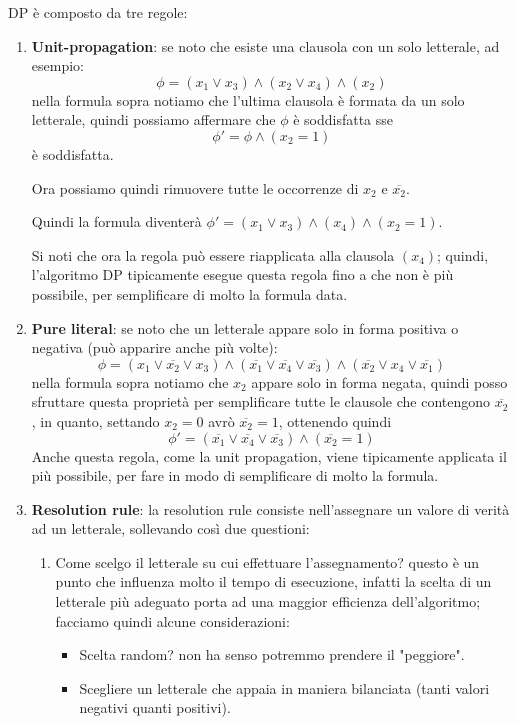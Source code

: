 \documentclass[12pt,a4paper]{article}
\begin{document}
DP è composto da tre regole:
\begin{enumerate}
\item \textbf{Unit-propagation}: se noto che esiste una clausola con un solo letterale, ad esempio: $$ \phi = (x_1 \vee x_3) \wedge (x_2 \vee x_4) \wedge (x_2)$$ nella formula sopra notiamo che l'ultima clausola è formata da un solo letterale, quindi possiamo affermare che $\phi$ è soddisfatta sse $$\phi' = \phi \wedge (x_2 = 1)$$ è soddisfatta.

Ora possiamo quindi rimuovere tutte le occorrenze di $x_2$ e $\overline{x_2}$.

Quindi la formula diventerà $\phi' = (x_1 \vee x_3) \wedge (x_4) \wedge (x_2 = 1)$.

Si noti che ora la regola può essere riapplicata alla clausola $(x_4)$; quindi, l'algoritmo DP tipicamente esegue questa regola fino a che non è più possibile, per semplificare di molto la formula data.
\item \textbf{Pure literal}: se noto che un letterale appare solo in forma positiva o negativa (può apparire anche più volte): $$ \phi = (x_1 \vee \overline{x_2} \vee x_3) \wedge (\overline{x_1} \vee \overline{x_4} \vee \overline{x_3}) \wedge (\overline{x_2} \vee x_4 \vee \overline{x_1})$$
nella formula sopra notiamo che $x_2$ appare solo in forma negata, quindi posso sfruttare questa proprietà per semplificare tutte le clausole che contengono $\overline{x_2}$, in quanto, settando $x_2 = 0$ avrò $\overline{x_2} = 1$, ottenendo quindi $$\phi' = (\overline{x_1} \vee \overline{x_4} \vee \overline{x_3}) \wedge (\overline{x_2} = 1)$$
Anche questa regola, come la unit propagation, viene tipicamente applicata il più possibile, per fare in modo di semplificare di molto la formula.
\item \textbf{Resolution rule}: la resolution rule consiste nell'assegnare un valore di verità ad un letterale, sollevando così due questioni:
\begin{enumerate}
\item Come scelgo il letterale su cui effettuare l'assegnamento? questo è un punto che influenza molto il tempo di esecuzione, infatti la scelta di un letterale più adeguato porta ad una maggior efficienza dell'algoritmo; facciamo quindi alcune considerazioni:
\begin{itemize}
\item Scelta random? non ha senso potremmo prendere il "peggiore".
\item Scegliere un letterale che appaia in maniera bilanciata (tanti valori negativi quanti positivi).

\end{itemize}
\end{enumerate}
\end{enumerate}
\end{document}
